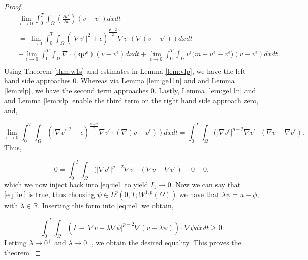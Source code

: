 \documentclass[10pt]{amsart}
\theoremstyle{plain}
\theoremstyle{definition}
\begin{document}
\begin{proof}
\begin{eqnarray}
&& \lim_{\epsilon \rightarrow 0} \int^{T}_{0}\int_{\Omega} \left( \frac{\partial v^{\epsilon}}{\partial t}  \right) ( v -  v^{\epsilon} )dx dt \nonumber \\
&& = \lim_{\epsilon \rightarrow 0} \int^{T}_{0}\int_{\Omega} ( |\nabla v^{\epsilon}|^{2}  + \epsilon )^{\frac{p-2}{2}} \nabla v^{\epsilon}  ( \nabla (v -  v^{\epsilon}))dx dt \nonumber \\
&& - \lim_{\epsilon \rightarrow 0} \int^{T}_{0}\int_{\Omega} \nabla\cdot (\textbf{q}  v^{\epsilon}) ( v -  v^{\epsilon} )dx dt
+ \lim_{\epsilon \rightarrow 0} \int^{T}_{0}\int_{\Omega} v^{\epsilon}\Big(m-u^{\epsilon}-v^{\epsilon}\Big) ( v -  v^{\epsilon} )dx dt. \nonumber \\
\end{eqnarray}
%
 Using Theorem \ref{thm:w1s} and estimates in Lemma \ref{lem:vlp}, we have the left hand side approaches 0. Whereas via Lemma \ref{lem:ge11n} and  and Lemma \ref{lem:vlp}, we have the second term approaches 0. Lastly, Lemma \ref{lem:ge11n} and  and Lemma \ref{lem:vlp} enable the third term on the right hand side approach zero, and,

 \begin{equation}
\lim_{\epsilon \rightarrow 0} \int^{T}_{0}\int_{\Omega} ( |\nabla v^{\epsilon}|^{2}  + \epsilon )^{\frac{p-2}{2}} \nabla v^{\epsilon} \cdot  ( \nabla ( v -   v^{\epsilon} ))dx dt =  \int^{T}_{0}\int_{\Omega} ( |\nabla v^{\epsilon}|^{p-2} \nabla v^{\epsilon} \cdot (\nabla v - \nabla v^{\epsilon}).
    \end{equation}
%
 Thus,

 \begin{equation}
0 =  \int^{T}_{0}\int_{\Omega} ( |\nabla v^{\epsilon}|^{p-2} \nabla v^{\epsilon} \cdot (\nabla v - \nabla v^{\epsilon}) + 0 + 0,
    \end{equation}
    which we now inject back into \eqref{eq:iiel} to yield $I_{1} \rightarrow 0$. Now we can say that \eqref{eq:iiel} is true, thus choosing $\psi \in L^{p}(0,T;W^{1,p}(\Omega))$ we have that $\lambda \psi = u - \phi$, with $\lambda \in \mathbb{R}$. Inserting this form into \eqref{eq:iiel} we obtain,

    \begin{equation}
\int^{T}_{0}\int_{\Omega}(\Gamma - |\nabla v - \lambda \nabla \psi|^{p-2} \nabla (v - \lambda  \psi)) \cdot \nabla \psi   dxdt \geq 0.
    \end{equation}
    Letting $\lambda \rightarrow 0^{+}$ and $\lambda \rightarrow 0^{-}$, we obtain the desired equality. This proves the theorem.
\end{proof}
\end{document}
